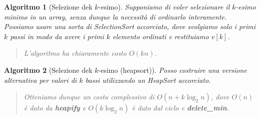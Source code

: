 \documentclass[oneside]{book}
\newtheorem{alg}{Algoritmo}
\begin{document}
\pagebreak

\begin{alg}[Selezione dek $k$-esimo]
  Supponiamo di voler selezionare il $k$-esimo minimo in un array, senza dunque
  la necessit\`a di ordinarlo interamente. Possiamo usare una sorta di
  SelectionSort accorciato, dove svolgiamo solo i primi $k$ passi in modo da
  avere i primi $k$ elemento ordinati e restituiamo $v[k]$.

  \begin{algorithm}[H]

  \end{algorithm}
  \begin{quote}
    L'algoritmo ha chiaramente costo $O(kn)$.
  \end{quote}
\end{alg}

\begin{alg}[Selezione dek $k$-esimo (heapsort)]
  Posso costruire una versione alternativa per valori di $k$ bassi utilizzando
  un HeapSort accorciato.

  \begin{algorithm}[H]

  \end{algorithm}
  \begin{quote}
    Otteniamo dunque un costo complessivo di $O(n + k\log_2n)$, dove $O(n)$ \`e
    dato da \textbf{heapify} e $O(k \log_2 n)$ \`e dato dal ciclo e \textbf{delete\_min}.
  \end{quote}
\end{alg}
\end{document}

